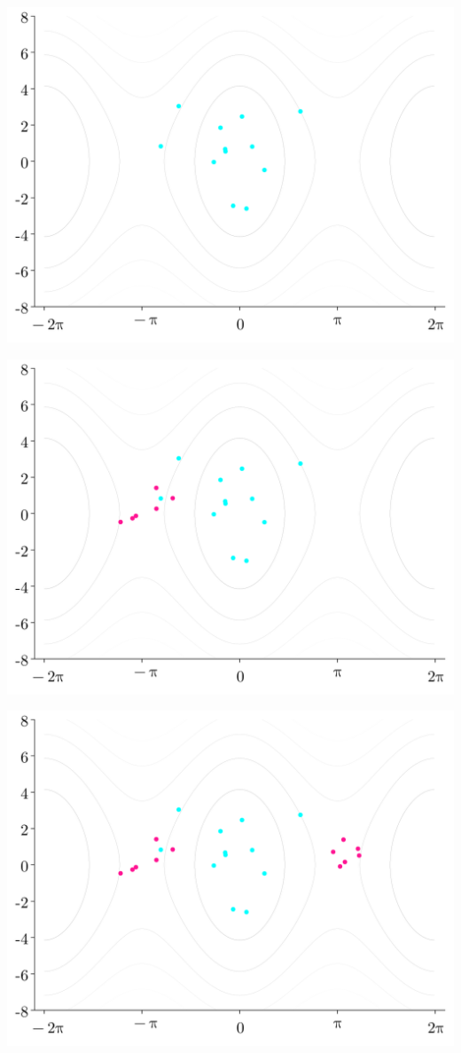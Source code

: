 \documentclass[
]{report}
\begin{document}
\includegraphics{contents/assets/neuralpbc/012.svg}

\includegraphics{contents/assets/neuralpbc/013.svg}

\includegraphics{contents/assets/neuralpbc/014.svg}
\end{document}
